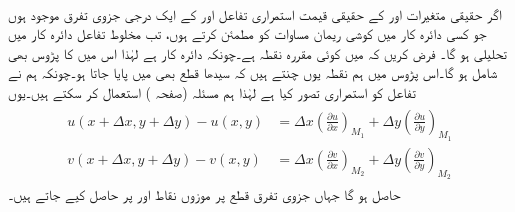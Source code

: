 \quad {}\\
اگر حقیقی متغیرات  اور  کے حقیقی قیمت استمراری تفاعل  اور  کے ایک درجی جزوی تفرق موجود ہوں جو کسی دائرہ کار  میں کوشی ریمان مساوات کو مطمئن کرتے ہوں، تب مخلوط تفاعل  دائرہ کار  میں تحلیلی ہو گا۔ 
فرض کریں کہ  میں  کوئی مقررہ نقطہ ہے۔چونکہ  دائرہ کار ہے لہٰذا اس میں  کا پڑوس بھی شامل ہو گا۔اس پڑوس میں ہم نقطہ  یوں چنتے ہیں کہ سیدھا قطع  بھی  میں پایا جاتا ہو۔چونکہ ہم نے تفاعل کو استمراری تصور کیا ہے لہٰذا ہم مسئلہ  (صفحہ ) استعمال کر سکتے ہیں۔یوں
\begin{gather}
\begin{aligned}\label{مساوات_مخلوط_کوشی_ریمان_مسئلہ_ثبوت_الف}
u(x+\Delta x,y+\Delta y)-u(x,y)&=\Delta x\left(\frac{\partial u}{\partial x}\right)_{M_1}+\Delta y\left(\frac{\partial u}{\partial y}\right)_{M_1}\\
v(x+\Delta x,y+\Delta y)-v(x,y)&=\Delta x\left(\frac{\partial v}{\partial x}\right)_{M_2}+\Delta y\left(\frac{\partial v}{\partial y}\right)_{M_2}
\end{aligned}
\end{gather}
حاصل ہو گا جہاں جزوی تفرق قطع  پر  موزوں نقاط  اور  پر حاصل کیے جاتے ہیں۔

